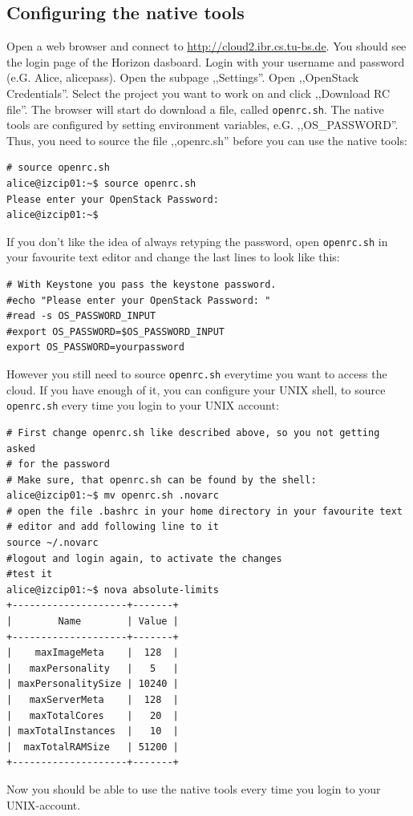 \documentclass[a4paper,ngerman,bibtotocliststotoc]{scrartcl}
\begin{document}
\subsection{Configuring the native tools}
\label{sec:conf-nova-pyth}
Open a web browser and connect to
\url{http://cloud2.ibr.cs.tu-bs.de}. You should see the login page of
the Horizon dasboard. Login with your username and password
(e.G. Alice, alicepass). Open the subpage ,,Settings''. Open
,,OpenStack Credentials''. Select the project you want to work on and
click ,,Download RC file''. The browser will start do download a file,
called \verb|openrc.sh|. The native tools are configured  by setting
environment variables, e.G. ,,OS\_PASSWORD''.  Thus, you need to source
the file ,,openrc.sh'' before you can use the native tools:
\begin{verbatim}
# source openrc.sh
alice@izcip01:~$ source openrc.sh
Please enter your OpenStack Password:
alice@izcip01:~$
\end{verbatim}
If you don't like the idea of always retyping the password, open
\verb|openrc.sh| in your favourite text editor and change the last lines
to look like this:
\begin{verbatim}
# With Keystone you pass the keystone password.
#echo "Please enter your OpenStack Password: "
#read -s OS_PASSWORD_INPUT
#export OS_PASSWORD=$OS_PASSWORD_INPUT
export OS_PASSWORD=yourpassword
\end{verbatim}
However you still need to source \verb|openrc.sh| everytime you want to
access the cloud. If you have enough of it, you can configure your
UNIX shell, to source \verb|openrc.sh| every time you login to your
UNIX account:
\begin{verbatim}
# First change openrc.sh like described above, so you not getting asked
# for the password
# Make sure, that openrc.sh can be found by the shell:
alice@izcip01:~$ mv openrc.sh .novarc
# open the file .bashrc in your home directory in your favourite text
# editor and add following line to it
source ~/.novarc
#logout and login again, to activate the changes
#test it
alice@izcip01:~$ nova absolute-limits
+--------------------+-------+
|        Name        | Value |
+--------------------+-------+
|    maxImageMeta    |  128  |
|   maxPersonality   |   5   |
| maxPersonalitySize | 10240 |
|   maxServerMeta    |  128  |
|   maxTotalCores    |   20  |
| maxTotalInstances  |   10  |
|  maxTotalRAMSize   | 51200 |
+--------------------+-------+
\end{verbatim}
Now you should be able to use the native tools every time you login to
your UNIX-account.
\end{document}
